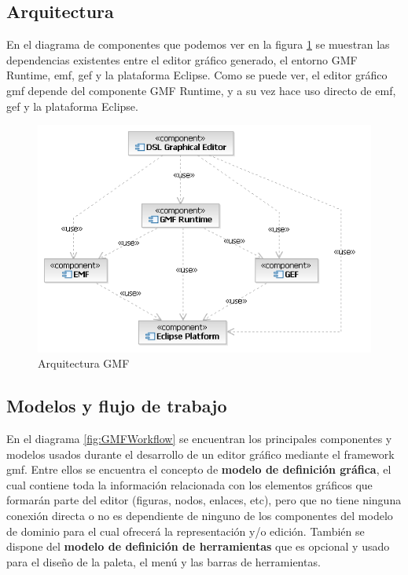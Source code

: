 \documentclass[a4paper,12pt,twoside,spanish,openright]{book}
\begin{document}
\subsection{Arquitectura}

En el diagrama de componentes que podemos ver en la figura \ref{fig:GMFArquitectura} se muestran las dependencias existentes entre el editor gráfico generado, el entorno \textsf{GMF Runtime}, \gls{emf}, \gls{gef} y la plataforma \textsf{Eclipse}. Como se puede ver, el editor gráfico \gls{gmf} depende del componente \textsf{GMF Runtime}, y a su vez hace uso directo de \gls{emf}, \gls{gef} y la plataforma \textsf{Eclipse}.


\begin{figure}[hbtp]
\centering
\includegraphics[scale=.75]{./img/GMFArquitectura}
\caption{Arquitectura GMF}
\label{fig:GMFArquitectura}
\end{figure}


\subsection{Modelos y flujo de trabajo}

En el diagrama \ref{fig:GMFWorkflow} se encuentran los principales componentes y modelos usados durante el desarrollo de un editor gráfico mediante el framework \gls{gmf}. Entre ellos se encuentra el concepto de \textbf{modelo de definición gráfica}, el cual contiene toda la información relacionada con los elementos gráficos que formarán parte del editor (figuras, nodos, enlaces, etc), pero que no tiene ninguna conexión directa o no es dependiente de ninguno de los componentes del modelo de dominio para el cual ofrecerá la representación y/o edición. También se dispone del \textbf{modelo de definición de herramientas} que es opcional y usado para el diseño de la paleta, el menú y las barras de herramientas.
\end{document}
